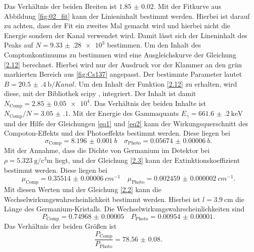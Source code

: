 Das Verhältnis der beiden Breiten ist $\num{1.85(2)}$. 
Mit der Fitkurve aus Abbildung \ref{fig:02_fit} kann der Linieninhalt bestimmt werden. Hierbei ist darauf zu achten, dass der Fit ein zweites Mal gemacht wird 
und hierbei nicht die Energie sondern der Kanal verwendet wird. Damit lässt sich der Lineninhalt des Peaks auf $N=\num{9.33(28)e3}$ bestimmen.
Um den Inhalt des Comptonkontinuums zu bestimmen wird eine Ausgleichskurve der Gleichung \ref{2.12} berechnet.
Hierbei wird nur der Ausdruck vor der Klammer an den grün markierten Bereich aus \ref{fig:Cs137} angepasst.
Der bestimmte Parameter lautet $B=\SI{20.5(4)}{\barn\per Kanal}$. Um den Inhalt der Funktion \ref{2.12} zu erhalten,
wird diese,  mit der Bibliothek scipy \cite{scipy}, integriert. Der Inhalt ist damit $N_{\text{Comp}} = \num{2.85(5)e4}$.
Das Verhältnis der beiden Inhalte ist $N_{\text{Comp}}/N=\num{3.05(10)}$.
Mit der Energie des Gammaquants $E_{\gamma}=\SI{661.6(2)}{\kilo\eV}$ und der Hilfe der Gleichungen \eqref{eq1} und 
\eqref{eq2} kann der Wirkungsquerschnitt des Compoton-Effekts und des Photoeffekts bestimmt werden.
Diese liegen bei 
\begin{equation*}
  \sigma_{\text{Comp}}=\SI{8.196(1)}{b} \quad \sigma_{\text{Photo}}=\SI{0.05674(6)}{b}.
\end{equation*} 
Mit der Annahme, dass die Dichte von Germanium im Detektor bei $\rho = \SI{5.323}{\gram\per\cubic\centi\meter}$ \cite{Germanium_rho} liegt, und der
Gleichung \eqref{2.3} kann der Extinktionskoeffizient bestimmt werden.
Diese liegen bei 
\begin{equation*}
  \mu_{\text{Comp}} = \SI{0.35514(6)}{cm^{-1}} \quad \mu_{\text{Photo}} = \SI{0.002459(2)}{cm^{-1}}.
\end{equation*}
Mit diesen Werten und der Gleichung \eqref{2.2} kann die Wechselwirkungswahrscheinlichkeit bestimmt werden.
Hierbei ist $l=\SI{3.9}{\centi\meter}$ die Länge des Germanium-Kristalls.
Die Wechselwirkungswahrscheinlichkeiten sind 
\begin{equation*}
  P_{\text{Comp}} = \num{0.74968(5)}\quad P_{\text{Photo}} = \num{0.00954(1)}.
\end{equation*}
Das Verhältnis der beiden Größen ist
\begin{equation*}
  \frac{P_{\text{Comp}} }{P_{\text{Photo}}} = \num{78.56(8)}.
\end{equation*}


